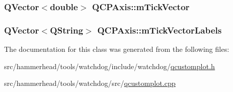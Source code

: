 \subsubsection[{\texorpdfstring{m\+Tick\+Vector}{mTickVector}}]{\setlength{\rightskip}{0pt plus 5cm}Q\+Vector$<$double$>$ Q\+C\+P\+Axis\+::m\+Tick\+Vector\hspace{0.3cm}{\ttfamily [protected]}}\hypertarget{classQCPAxis_aae0f9b9973b85be601200f00f5825087}{}\label{classQCPAxis_aae0f9b9973b85be601200f00f5825087}
\subsubsection[{\texorpdfstring{m\+Tick\+Vector\+Labels}{mTickVectorLabels}}]{\setlength{\rightskip}{0pt plus 5cm}Q\+Vector$<$Q\+String$>$ Q\+C\+P\+Axis\+::m\+Tick\+Vector\+Labels\hspace{0.3cm}{\ttfamily [protected]}}\hypertarget{classQCPAxis_aeee4bd0fca3f587eafe33843d1cb4f82}{}\label{classQCPAxis_aeee4bd0fca3f587eafe33843d1cb4f82}


The documentation for this class was generated from the following files\+:\begin{DoxyCompactItemize}
\item 
src/hammerhead/tools/watchdog/include/watchdog/\hyperlink{qcustomplot_8h}{qcustomplot.\+h}\item 
src/hammerhead/tools/watchdog/src/\hyperlink{qcustomplot_8cpp}{qcustomplot.\+cpp}\end{DoxyCompactItemize}
